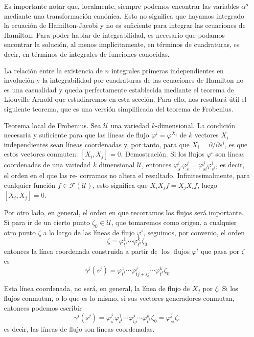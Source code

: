 Es importante notar que, localmente, siempre podemos encontrar las variables $\alpha^{a}$ mediante una transformación canónica. Esto no significa que hayamos integrado la ecuación de Hamilton-Jacobi y no es suficiente para integrar las ecuaciones de Hamilton. Para poder hablar de integrabilidad, es necesario que podamos encontrar la solución, al menos implícitamente, en términos de cuadraturas, es decir, en términos de integrales de funciones conocidas.

La relación entre la existencia de $n$ integrales primeras independientes en involución y la integrabilidad por cuadraturas de las ecuaciones de Hamilton no es una casualidad y queda perfectamente establecida mediante el teorema de Liouville-Arnold que estudiaremos en esta sección. Para ello, nos resultará útil el siguiente teorema, que es una versión simplificada del teorema de Frobenius.

Teorema local de Frobenius. Sea $\mathscr{U}$ una variedad $k$-dimensional. La condición necesaria y suficiente para que las líneas de flujo $\varphi^{i}=\varphi^{X_{i}}$ de $k$ vectores $X_{i}$ independientes sean líneas coordenadas y, por tanto, para que $X_{i}=\partial / \partial s^{i}$, es que estos vectores conmuten: $\left[X_{i}, X_{j}\right]=0$.
Demostración. Si los flujos $\varphi^{i}$ son líneas coordenadas de una variedad $k$ dimensional $\mathscr{U}$, entonces $\varphi_{s^{i}}^{i} \varphi_{s}^{j}=\varphi_{s i}^{j} \varphi_{s^{i}}^{i}$, es decir, el orden en el que las re-
corramos no altera el resultado. Infinitesimalmente, para cualquier función $f \in \mathscr{F}(\mathscr{U})$, esto significa que $X_{i} X_{j} f=X_{j} X_{i} f$, luego $\left[X_{i}, X_{j}\right]=0$.

Por otro lado, en general, el orden en que recorramos los flujos será importante. Si para ir de un cierto punto $\zeta_{0} \in \mathscr{U}$, que tomaremos como origen, a cualquier otro punto $\zeta$ a lo largo de las líneas de flujo $\varphi^{i}$, seguimos, por convenio, el orden
$$
\zeta=\varphi_{t^{1}}^{1} \cdots \varphi_{t^{k}}^{k} \zeta_{0}
$$
entonces la línea coordenada construida a partir de $\operatorname{los}$ flujos $\varphi^{i}$ que pasa por $\zeta$ es
$$
\gamma^{j}\left(s^{j}\right)=\varphi_{t^{1}}^{1} \cdots \varphi_{t j+s j}^{j} \cdots \varphi_{t^{k}}^{k} \zeta_{0}
$$

Esta línea coordenada, no será, en general, la línea de flujo de $X_{j}$ por $\xi$. Si los flujos conmutan, o lo que es lo mismo, si sus vectores generadores conmutan, entonces podemos escribir
$$
\gamma^{j}\left(s^{j}\right)=\varphi_{s^{\prime}}^{j} \varphi_{t^{1}}^{1} \cdots \varphi_{t j}^{j} \cdots \varphi_{t^{k}}^{k} \zeta_{0}=\varphi_{s{ }^{j}}^{j} \zeta,
$$
es decir, las líneas de flujo son líneas coordenadas.
